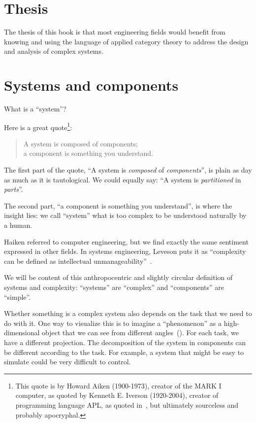 
\section{Thesis}

The thesis of this book is that most engineering fields would benefit
from knowing and using the language of applied category theory to
address the design and analysis of complex systems.

\section{Systems and components}
\label{sec:systems-and-components}

What is a ``system''?

Here is a great quote\footnote{
  This quote is by Howard Aiken (1900-1973), creator of the MARK I computer,
  as quoted by Kenneth E. Iverson (1920-2004), creator of programming language APL,
  as quoted in~\cite{McIntyre1999Role}, but ultimately sourceless and probably apocryphal.
}:

\begin{quote}
  A system is composed of components;  \\
  a component is something you understand.
\end{quote}

The first part of the quote, ``A system is \emph{composed} of \emph{components}'', is plain as day as much as it is tautological. We could equally say: ``A system is \emph{partitioned} in \emph{parts}''.

The second part, ``a component is something you understand'', is where the insight lies: we call ``system'' what is too complex to be understood naturally by a human.

Haiken referred to computer engineering, but we find exactly the same sentiment expressed in other fields. In systems engineering, Leveson puts it as ``complexity can be defined as intellectual unmanageability''~\cite{leveson12engineering}.

We will be content of this anthropocentric and slightly circular definition of systems and
complexity: ``systems'' are ``complex'' and ``components'' are ``simple''.

Whether something is a complex system also depends on the task that we need to do with it. One
way to visualize this is to imagine a ``phenomenon'' as a high-dimensional object that we can see
from different angles~(). For each task, we have a different
projection. The decomposition of the system in components can be different according to the
task. For example, a system that might be easy to simulate could be very difficult to control.

